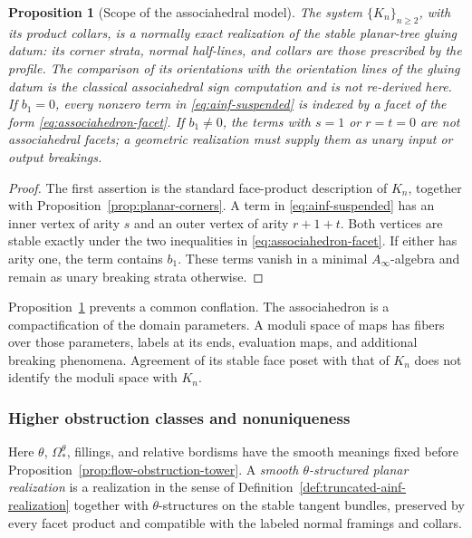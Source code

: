 \documentclass[11pt,letterpaper,twoside]{article}
\theoremstyle{plain}
\newtheorem{proposition}[theorem]{Proposition}
\theoremstyle{definition}
\theoremstyle{remark}
\newcommand{\Ainf}{A_\infty}
\begin{document}
\begin{proposition}[Scope of the associahedral model]\label{prop:associahedral-scope}
The system \(\{K_n\}_{n\geq2}\), with its product collars, is a normally exact realization of the stable planar-tree gluing datum: its corner strata, normal half-lines, and collars are those prescribed by the profile.  The comparison of its orientations with the orientation lines of the gluing datum is the classical associahedral sign computation and is not re-derived here.  If \(b_1=0\), every nonzero term in \eqref{eq:ainf-suspended} is indexed by a facet of the form \eqref{eq:associahedron-facet}.  If \(b_1\neq0\), the terms with \(s=1\) or \(r=t=0\) are not associahedral facets; a geometric realization must supply them as unary input or output breakings.
\end{proposition}

\begin{proof}
The first assertion is the standard face-product description of \(K_n\), together with Proposition~\ref{prop:planar-corners}.  A term in \eqref{eq:ainf-suspended} has an inner vertex of arity \(s\) and an outer vertex of arity \(r+1+t\).  Both vertices are stable exactly under the two inequalities in \eqref{eq:associahedron-facet}.  If either has arity one, the term contains \(b_1\).  These terms vanish in a minimal \(\Ainf\)-algebra and remain as unary breaking strata otherwise.
\end{proof}

Proposition~\ref{prop:associahedral-scope} prevents a common conflation.  The associahedron is a compactification of the domain parameters.  A moduli space of maps has fibers over those parameters, labels at its ends, evaluation maps, and additional breaking phenomena.  Agreement of its stable face poset with that of \(K_n\) does not identify the moduli space with \(K_n\).

\subsubsection{Higher obstruction classes and nonuniqueness}

Here \(\theta\), \(\Omega_*^\theta\), fillings, and relative bordisms have the smooth meanings fixed before Proposition~\ref{prop:flow-obstruction-tower}.  A \emph{smooth \(\theta\)-structured planar realization} is a realization in the sense of Definition~\ref{def:truncated-ainf-realization} together with \(\theta\)-structures on the stable tangent bundles, preserved by every facet product and compatible with the labeled normal framings and collars.
\end{document}
